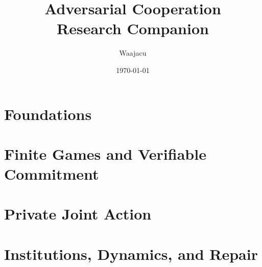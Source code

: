 \documentclass[12pt,openany]{book}
\title{Adversarial Cooperation\\[0.5em]\large Research Companion}
\author{Waajacu}
\date{\today}
\begin{document}
\raggedbottom

\frontmatter
\maketitle

\tableofcontents

\mainmatter

\part{Foundations}







\part{Finite Games and Verifiable Commitment}





\part{Private Joint Action}








\part{Institutions, Dynamics, and Repair}









\end{document}
